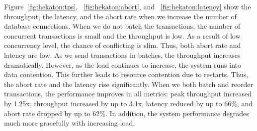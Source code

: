 Figure~\ref{fig:hekaton:tps}, ~\ref{fig:hekaton:abort}, and ~\ref{fig:hekaton:latency} show the throughput, the latency, and the abort rate when we increase the number of database connections. When we do not batch the transactions, the number of concurrent transactions is small and the throughput is low. As a result of low concurrency level, the chance of conflicting is slim. Thus, both abort rate and latency are low. As we send transactions in batches, the throughput increases dramatically. However, as the load continues to increase, the system runs into data contention. This further leads to resource contention due to restarts. Thus, the abort rate and the latency rise significantly. When we both batch and reorder transactions, the performance improves in all metrics: peak throughput increased by 1.25x, throughput increased by up to 3.1x, latency reduced by up to 66\%, and abort rate dropped by up to 62\%. In addition, the system performance degrades much more gracefully with increasing load.
